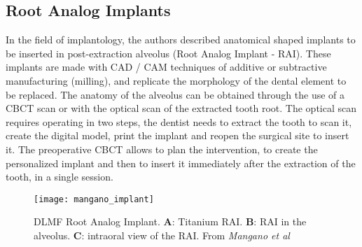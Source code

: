 \subsection{Root Analog Implants}
In the field of implantology, the authors described anatomical shaped implants to be inserted in post-extraction alveolus (Root Analog Implant - RAI). These implants are made with CAD / CAM techniques of additive or subtractive manufacturing (milling), and replicate the morphology of the dental element to be replaced. The anatomy of the alveolus can be obtained through the use of a CBCT scan or with the optical scan of the extracted tooth root. The optical scan requires operating in two steps, the dentist needs to extract the tooth to scan it, create the digital model, print the implant and reopen the surgical site to insert it. The preoperative CBCT allows to plan the intervention, to create the personalized implant and then to insert it immediately after the extraction of the tooth, in a single session.
\begin{figure}[h]
\vspace{-10pt}
	\begin{center}
	\texttt{[image: mangano\_implant]}
    \caption{DLMF Root Analog Implant. \textbf{A}: Titanium RAI. \textbf{B}: RAI in the alveolus. \textbf{C}: intraoral view of the RAI. From \emph{Mangano et al} \parencite{Reference84}}
    \label{fig:mangano_implant}
    \end{center}
\vspace{-20pt}
\end{figure}

